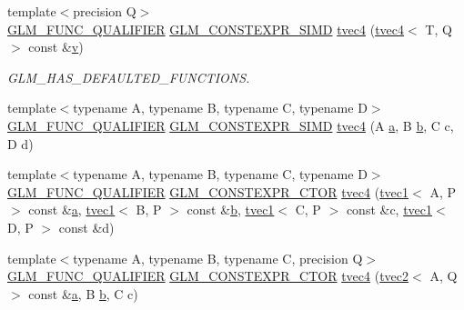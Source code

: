 \begin{DoxyCompactItemize}
\item 
{\footnotesize template$<$precision Q$>$ }\\\mbox{\hyperlink{setup_8hpp_a33fdea6f91c5f834105f7415e2a64407}{G\+L\+M\+\_\+\+F\+U\+N\+C\+\_\+\+Q\+U\+A\+L\+I\+F\+I\+ER}} \mbox{\hyperlink{setup_8hpp_ae5de828d10226b21e2123dd61f3cb5ed}{G\+L\+M\+\_\+\+C\+O\+N\+S\+T\+E\+X\+P\+R\+\_\+\+S\+I\+MD}} \mbox{\hyperlink{structglm_1_1tvec4_a9e9e0e3167fcd351433d379fa90c16bd}{tvec4}} (\mbox{\hyperlink{structglm_1_1tvec4}{tvec4}}$<$ T, Q $>$ const \&\mbox{\hyperlink{glad_8h_a14cfbe2fc2234f5504618905b69d1e06}{v}})
\begin{DoxyCompactList}\small\item\em G\+L\+M\+\_\+\+H\+A\+S\+\_\+\+D\+E\+F\+A\+U\+L\+T\+E\+D\+\_\+\+F\+U\+N\+C\+T\+I\+O\+NS. \end{DoxyCompactList}\item 
{\footnotesize template$<$typename A, typename B, typename C, typename D$>$ }\\\mbox{\hyperlink{setup_8hpp_a33fdea6f91c5f834105f7415e2a64407}{G\+L\+M\+\_\+\+F\+U\+N\+C\+\_\+\+Q\+U\+A\+L\+I\+F\+I\+ER}} \mbox{\hyperlink{setup_8hpp_ae5de828d10226b21e2123dd61f3cb5ed}{G\+L\+M\+\_\+\+C\+O\+N\+S\+T\+E\+X\+P\+R\+\_\+\+S\+I\+MD}} \mbox{\hyperlink{structglm_1_1tvec4_ab8f77251d80df00048516ad6a8d16ba5}{tvec4}} (A \mbox{\hyperlink{glad_8h_ac8729153468b5dcf13f971b21d84d4e5}{a}}, B \mbox{\hyperlink{glad_8h_a6eba317e3cf44d6d26c04a5a8f197dcb}{b}}, C c, D d)
\item 
{\footnotesize template$<$typename A, typename B, typename C, typename D$>$ }\\\mbox{\hyperlink{setup_8hpp_a33fdea6f91c5f834105f7415e2a64407}{G\+L\+M\+\_\+\+F\+U\+N\+C\+\_\+\+Q\+U\+A\+L\+I\+F\+I\+ER}} \mbox{\hyperlink{setup_8hpp_ad34178a09666081abdb573c14d1f4a5a}{G\+L\+M\+\_\+\+C\+O\+N\+S\+T\+E\+X\+P\+R\+\_\+\+C\+T\+OR}} \mbox{\hyperlink{structglm_1_1tvec4_a77748f70d885075262c53edf498cfb7a}{tvec4}} (\mbox{\hyperlink{structglm_1_1tvec1}{tvec1}}$<$ A, P $>$ const \&\mbox{\hyperlink{glad_8h_ac8729153468b5dcf13f971b21d84d4e5}{a}}, \mbox{\hyperlink{structglm_1_1tvec1}{tvec1}}$<$ B, P $>$ const \&\mbox{\hyperlink{glad_8h_a6eba317e3cf44d6d26c04a5a8f197dcb}{b}}, \mbox{\hyperlink{structglm_1_1tvec1}{tvec1}}$<$ C, P $>$ const \&c, \mbox{\hyperlink{structglm_1_1tvec1}{tvec1}}$<$ D, P $>$ const \&d)
\item 
{\footnotesize template$<$typename A, typename B, typename C, precision Q$>$ }\\\mbox{\hyperlink{setup_8hpp_a33fdea6f91c5f834105f7415e2a64407}{G\+L\+M\+\_\+\+F\+U\+N\+C\+\_\+\+Q\+U\+A\+L\+I\+F\+I\+ER}} \mbox{\hyperlink{setup_8hpp_ad34178a09666081abdb573c14d1f4a5a}{G\+L\+M\+\_\+\+C\+O\+N\+S\+T\+E\+X\+P\+R\+\_\+\+C\+T\+OR}} \mbox{\hyperlink{structglm_1_1tvec4_abc80d97085b0385612ae216bde4c830c}{tvec4}} (\mbox{\hyperlink{structglm_1_1tvec2}{tvec2}}$<$ A, Q $>$ const \&\mbox{\hyperlink{glad_8h_ac8729153468b5dcf13f971b21d84d4e5}{a}}, B \mbox{\hyperlink{glad_8h_a6eba317e3cf44d6d26c04a5a8f197dcb}{b}}, C c)

\end{DoxyCompactItemize}
